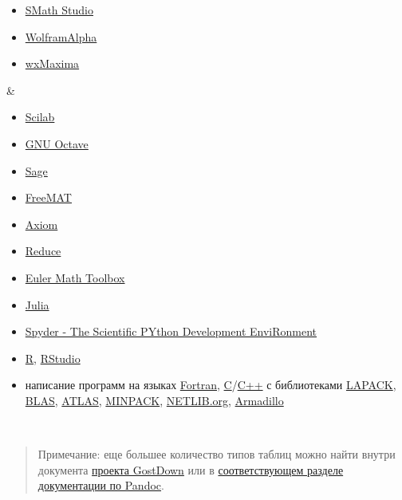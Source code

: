 \documentclass[
  a4paper,
]{book}
\providecommand{\tightlist}{%
  \setlength{\itemsep}{0pt}\setlength{\parskip}{0pt}}
\theoremstyle{definition}
\theoremstyle{definition}
\theoremstyle{definition}
\theoremstyle{definition}
\theoremstyle{remark}
\begin{document}
\begin{longtable}[]
\begin{minipage}[t]{\linewidth}
\begin{itemize}
\tightlist
\item
  \href{http://smath.info}{SMath Studio}
\item
  \href{http://www.wolframalpha.com}{WolframAlpha}
\item
  \href{http://andrejv.github.io/wxmaxima}{wxMaxima}
\end{itemize}
\end{minipage} & \begin{minipage}[t]{\linewidth}\raggedright
\begin{itemize}
\tightlist
\item
  \href{http://scilab.org/}{Scilab}
\item
  \href{https://www.gnu.org/software/octave/}{GNU Octave}
\item
  \href{http://www.sagemath.org/}{Sage}
\item
  \href{http://freemat.sourceforge.net/}{FreeMAT}
\item
  \href{http://axiom-developer.org}{Axiom}
\item
  \href{https://reduce-algebra.sourceforge.io}{Reduce}
\item
  \href{http://euler.rene-grothmann.de/index.html}{Euler Math Toolbox}
\item
  \href{http://julialang.org/}{Julia}
\item
  \href{https://code.google.com/p/spyderlib/}{Spyder - The Scientific PYthon Development EnviRonment}
\item
  \href{https://cran.rstudio.com/}{R}, \href{https://rstudio.com/products/rstudio/}{RStudio}
\item
  написание программ на языках \href{http://en.wikipedia.org/wiki/Fortran}{Fortran},
  \href{http://en.wikipedia.org/wiki/C_(programming_language)}{C}/\href{http://en.wikipedia.org/wiki/C++}{C++} с
  библиотеками \href{http://www.netlib.org/lapack/}{LAPACK}, \href{http://www.netlib.org/blas/}{BLAS},
  \href{http://math-atlas.sourceforge.net/}{ATLAS},
  \href{http://www.netlib.org/minpack/}{MINPACK}, \href{http://netlib.org/}{NETLIB.org},
  \href{http://arma.sourceforge.net/}{Armadillo}
\end{itemize}
\end{minipage} \\
\end{longtable}

\begin{quote}
Примечание: еще большее количество типов таблиц можно найти внутри документа \href{https://gitlab.iaaras.ru/iaaras/gostdown/blob/master/demo-main.md}{проекта GostDown} или в \href{https://pandoc.org/MANUAL.html\#tables}{соответствующем разделе документации по Pandoc}.
\end{quote}
\end{document}
